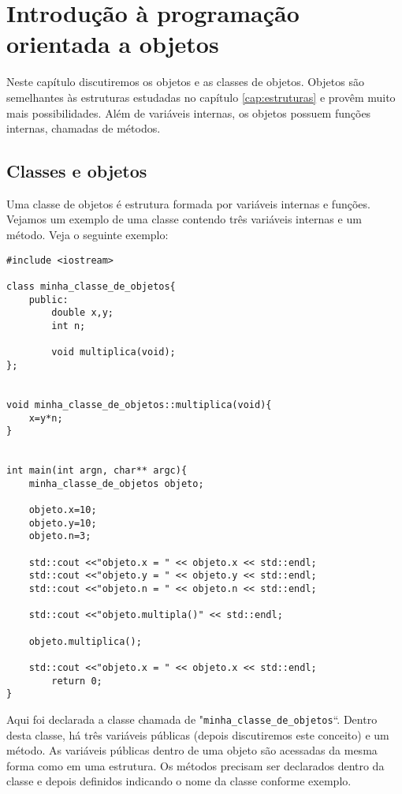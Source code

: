 
\chapter{Introdução à programação orientada a objetos}
Neste capítulo discutiremos os objetos e as classes de objetos. Objetos são semelhantes às estruturas estudadas no capítulo \ref{cap:estruturas} e provêm muito mais possibilidades. Além de variáveis internas, os objetos possuem funções internas, chamadas de métodos.

\section{Classes e objetos}

Uma classe de objetos é estrutura formada por variáveis internas e funções. Vejamos um exemplo de uma classe contendo três variáveis internas e um método.
Veja o seguinte exemplo:
\begin{verbatim}
#include <iostream>

class minha_classe_de_objetos{
	public:
		double x,y;
		int n;

		void multiplica(void);
};


void minha_classe_de_objetos::multiplica(void){
	x=y*n;
}


int main(int argn, char** argc){
	minha_classe_de_objetos objeto; 
	
	objeto.x=10;
	objeto.y=10;
	objeto.n=3;
	
	std::cout <<"objeto.x = " << objeto.x << std::endl;
	std::cout <<"objeto.y = " << objeto.y << std::endl;
	std::cout <<"objeto.n = " << objeto.n << std::endl;

	std::cout <<"objeto.multipla()" << std::endl;

	objeto.multiplica();

	std::cout <<"objeto.x = " << objeto.x << std::endl;
        return 0;
}
\end{verbatim}

Aqui foi declarada a classe chamada de "\verb|minha_classe_de_objetos|``. Dentro desta classe, há três variáveis públicas (depois discutiremos este conceito) e um método. As variáveis públicas dentro de uma objeto são acessadas da mesma forma como em uma estrutura. Os métodos precisam ser declarados dentro da classe e depois definidos indicando o nome da classe conforme exemplo.


